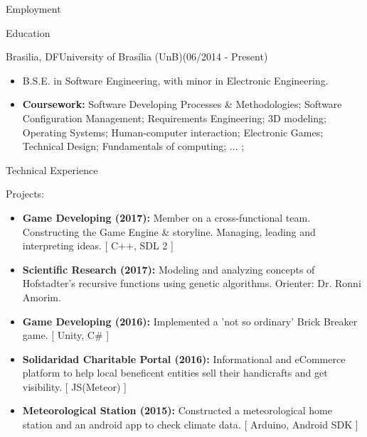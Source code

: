 \documentclass[]{fraguilarcv}
\begin{document}
\begin{cvsection}{Employment}
	\begin{cvsection}{Education}
		\begin{cvsubsection}{Brasilia, DF}{University of Brasília (UnB)}{(06/2014 - Present)}
			\begin{itemize}
				\item B.S.E. in Software Engineering, with minor in Electronic Engineering.
				\item \textbf{Coursework:} {Software Developing Processes \& Methodologies; Software Configuration Management;  Requirements Engineering; 3D modeling; Operating Systems; Human-computer interaction; Electronic Games; Technical Design; Fundamentals of computing; ... ;}
			\end{itemize}
		\end{cvsubsection}
	\end{cvsection}
    
	\begin{cvsection}{Technical Experience}
		\begin{cvsubsection}{Projects:}{}{}
			\begin{itemize}
            	\item \textbf{Game Developing (2017):} Member on a cross-functional team. Constructing the Game Engine \& storyline. Managing, leading and interpreting ideas. [ C++, SDL 2 ]
				\item \textbf{Scientific Research (2017):} Modeling and analyzing concepts of Hofstadter's recursive functions using genetic algorithms. Orienter: Dr. Ronni Amorim.
                \item \textbf{Game Developing (2016):} Implemented a 'not so ordinary' Brick Breaker game. [ Unity, C\# ]
                \item \textbf{Solidaridad Charitable Portal (2016):} Informational and eCommerce platform to help local beneficent entities sell their handicrafts and get visibility. [ JS(Meteor) ]
                \item \textbf{Meteorological Station (2015):} Constructed a meteorological home station and an android app to check climate data. [ Arduino, Android SDK ]
			\end{itemize}
		\end{cvsubsection}
	\end{cvsection}
    

\end{cvsection}
\end{document}
